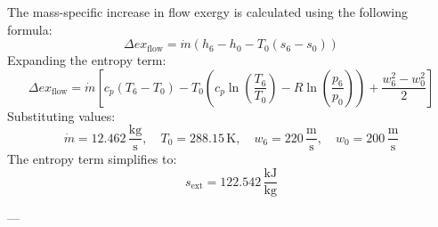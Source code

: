The mass-specific increase in flow exergy is calculated using the following formula:  
\[
\Delta ex_{\text{flow}} = \dot{m} \left( h_6 - h_0 - T_0 \left( s_6 - s_0 \right) \right)
\]  
Expanding the entropy term:  
\[
\Delta ex_{\text{flow}} = \dot{m} \left[ c_p \left( T_6 - T_0 \right) - T_0 \left( c_p \ln \left( \frac{T_6}{T_0} \right) - R \ln \left( \frac{p_6}{p_0} \right) \right) + \frac{w_6^2 - w_0^2}{2} \right]
\]  
Substituting values:  
\[
\dot{m} = 12.462 \, \frac{\text{kg}}{\text{s}}, \quad T_0 = 288.15 \, \text{K}, \quad w_6 = 220 \, \frac{\text{m}}{\text{s}}, \quad w_0 = 200 \, \frac{\text{m}}{\text{s}}
\]  
The entropy term simplifies to:  
\[
s_{\text{ext}} = 122.542 \, \frac{\text{kJ}}{\text{kg}}
\]  

---
